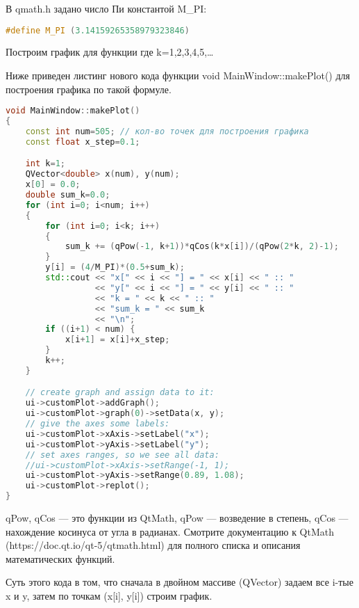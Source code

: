 В qmath.h задано число Пи константой M\_PI:
\begin{lstlisting}[language=c++]
#define M_PI (3.14159265358979323846)
\end{lstlisting}

Построим график для функции
где k=1,2,3,4,5,…

Ниже приведен листинг нового кода функции void MainWindow::makePlot() для построения графика по такой формуле.

\begin{lstlisting}[language=c++]
void MainWindow::makePlot()
{
    const int num=505; // кол-во точек для построения графика
    const float x_step=0.1;

    int k=1;
    QVector<double> x(num), y(num);
    x[0] = 0.0;
    double sum_k=0.0;
    for (int i=0; i<num; i++)
    {
        for (int i=0; i<k; i++)
        {
            sum_k += (qPow(-1, k+1))*qCos(k*x[i])/(qPow(2*k, 2)-1);
        }
        y[i] = (4/M_PI)*(0.5+sum_k);
        std::cout << "x[" << i << "] = " << x[i] << " :: "
                  << "y[" << i << "] = " << y[i] << " :: "
                  << "k = " << k << " :: "
                  << "sum_k = " << sum_k
                  << "\n";
        if ((i+1) < num) {
            x[i+1] = x[i]+x_step;
        }
        k++;
    }

    // create graph and assign data to it:
    ui->customPlot->addGraph();
    ui->customPlot->graph(0)->setData(x, y);
    // give the axes some labels:
    ui->customPlot->xAxis->setLabel("x");
    ui->customPlot->yAxis->setLabel("y");
    // set axes ranges, so we see all data:
    //ui->customPlot->xAxis->setRange(-1, 1);
    ui->customPlot->yAxis->setRange(0.89, 1.08);
    ui->customPlot->replot();
}
\end{lstlisting}

qPow, qCos — это функции из QtMath, qPow — возведение в степень, qCos — нахождение косинуса от угла в радианах. Смотрите документацию к QtMath (https://doc.qt.io/qt-5/qtmath.html) для полного списка и описания математических функций.

Суть этого кода в том, что сначала в двойном массиве (QVector) задаем все i-тые x и y, затем по точкам (x[i], y[i]) строим график.


\clearpage
